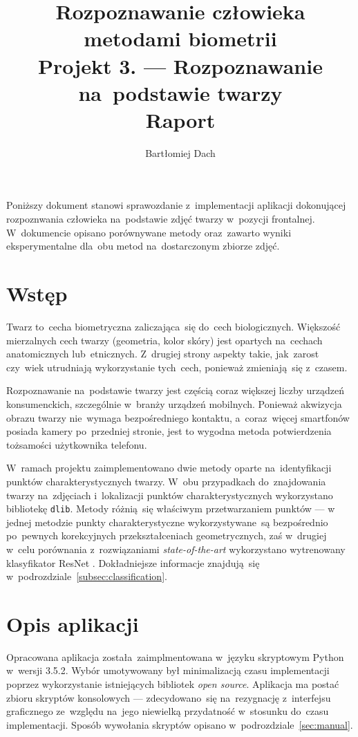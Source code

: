 \documentclass[11pt,a4paper]{article}
\begin{document}
\title{Rozpoznawanie człowieka metodami biometrii \\
\Large{
    Projekt 3. --- Rozpoznawanie na~podstawie twarzy \\
    Raport
}}
\author{Bartłomiej Dach}
\maketitle
Poniższy dokument stanowi sprawozdanie z~implementacji aplikacji dokonującej rozpoznwania człowieka na~podstawie zdjęć twarzy w~pozycji frontalnej.
W~dokumencie opisano porównywane metody oraz~zawarto wyniki eksperymentalne dla~obu metod na~dostarczonym zbiorze zdjęć.

\section{Wstęp}

Twarz to~cecha biometryczna zaliczająca~się do~cech biologicznych.
Większość mierzalnych cech twarzy (geometria, kolor skóry) jest opartych na~cechach anatomicznych lub~etnicznych.
Z~drugiej strony aspekty takie, jak~zarost czy~wiek utrudniają wykorzystanie tych~cech, ponieważ zmieniają~się z~czasem.

Rozpoznawanie na~podstawie twarzy jest częścią coraz większej liczby urządzeń konsumenckich, szczególnie w~branży urządzeń mobilnych.
Ponieważ akwizycja obrazu twarzy nie~wymaga bezpośredniego kontaktu, a~coraz~więcej smartfonów posiada kamery po~przedniej stronie, jest to wygodna metoda potwierdzenia tożsamości użytkownika telefonu.

W~ramach projektu zaimplementowano dwie metody oparte na~identyfikacji punktów charakterystycznych twarzy.
W~obu przypadkach do~znajdowania twarzy na~zdjęciach i~lokalizacji punktów charakterystycznych wykorzystano bibliotekę \texttt{dlib}.
Metody różnią~się właściwym przetwarzaniem punktów --- w jednej metodzie punkty charakterystyczne wykorzystywane~są bezpośrednio po~pewnych korekcyjnych przekształceniach geometrycznych, zaś w~drugiej w~celu porównania z~rozwiązaniami \emph{state-of-the-art} wykorzystano wytrenowany klasyfikator ResNet \cite{he2015, king2015}.
Dokładniejsze informacje znajdują~się w~podrozdziale~\ref{subsec:classification}.

\section{Opis aplikacji}

Opracowana aplikacja została zaimplmentowana w~języku skryptowym Python w~wersji 3.5.2.
Wybór umotywowany był minimalizacją czasu implementacji poprzez wykorzystanie istniejących bibliotek \emph{open source}.
Aplikacja ma postać zbioru skryptów konsolowych --- zdecydowano~się na~rezygnację z~interfejsu graficznego ze~względu na~jego niewielką przydatność w~stosunku do~czasu implementacji.
Sposób wywołania skryptów opisano w~podrozdziale~\ref{sec:manual}.
\end{document}
